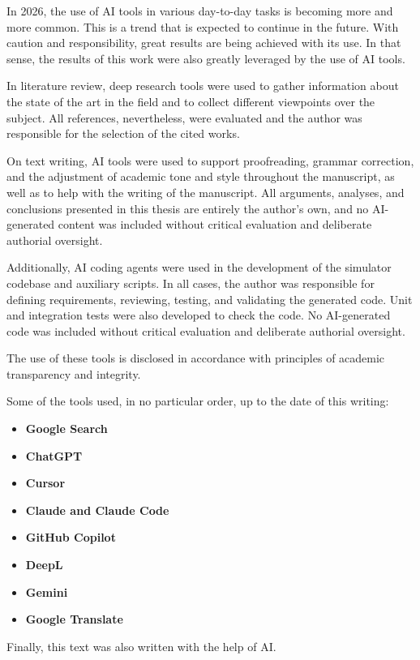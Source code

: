 
In 2026, the use of AI tools in various day-to-day tasks is becoming more and more common. This is a trend that is expected to continue in the future. With caution and responsibility, great results are being achieved with its use.
In that sense, the results of this work were also greatly leveraged by the use of AI tools.

In literature review, deep research tools were used to gather information about the state of the art in the field and to collect different viewpoints over the subject. All references, nevertheless, were evaluated and the author was responsible for the selection of the cited works.

On text writing, AI tools were used to support proofreading, grammar correction, and the adjustment of academic tone and style throughout the manuscript, as well as to help with the writing of the manuscript. All arguments, analyses, and conclusions presented in this thesis are entirely the author's own, and no AI-generated content was included without critical evaluation and deliberate authorial oversight.

Additionally, AI coding agents were used in the development of the simulator codebase and auxiliary scripts. In all cases, the author was responsible for defining requirements, reviewing, testing, and validating the generated code. Unit and integration tests were also developed to check the code.
No AI-generated code was included without critical evaluation and deliberate authorial oversight.

The use of these tools is disclosed in accordance with principles of academic transparency and integrity.

Some of the tools used, in no particular order, up to the date of this writing:
\begin{itemize}
  \item \textbf{Google Search}
  \item \textbf{ChatGPT}
  \item \textbf{Cursor}
  \item \textbf{Claude and Claude Code}
  \item \textbf{GitHub Copilot}
  \item \textbf{DeepL}
  \item \textbf{Gemini}
  \item \textbf{Google Translate}
\end{itemize}

Finally, this text was also written with the help of AI.
